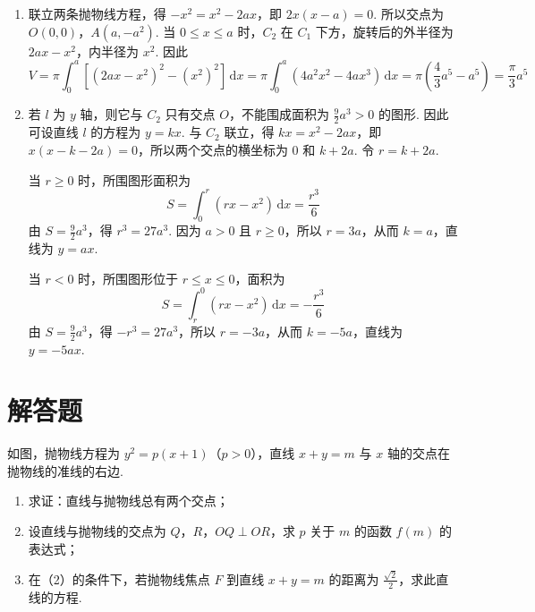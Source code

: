 \begin{solution}
\begin{enumerate}
\item 联立两条抛物线方程，得 \(-x^2=x^2-2ax\)，即 \(2x(x-a)=0\). 所以交点为 \(O(0,0)\)，\(A(a,-a^2)\). 当 \(0\leqslant x\leqslant a\) 时，\(C_2\) 在 \(C_1\) 下方，旋转后的外半径为 \(2ax-x^2\)，内半径为 \(x^2\). 因此
\[
V=\pi\int_0^a\left[(2ax-x^2)^2-(x^2)^2\right]\,\mathrm{d}x
=\pi\int_0^a(4a^2x^2-4ax^3)\,\mathrm{d}x
=\pi\left(\frac43a^5-a^5\right)=\frac\pi3a^5
\]
\item 若 \(l\) 为 \(y\) 轴，则它与 \(C_2\) 只有交点 \(O\)，不能围成面积为 \(\frac92a^3>0\) 的图形. 因此可设直线 \(l\) 的方程为 \(y=kx\). 与 \(C_2\) 联立，得 \(kx=x^2-2ax\)，即 \(x(x-k-2a)=0\)，所以两个交点的横坐标为 \(0\) 和 \(k+2a\). 令 \(r=k+2a\).

当 \(r\geqslant0\) 时，所围图形面积为
\[
S=\int_0^r\left(rx-x^2\right)\,\mathrm{d}x=\frac{r^3}{6}
\]
由 \(S=\frac92a^3\)，得 \(r^3=27a^3\). 因为 \(a>0\) 且 \(r\geqslant0\)，所以 \(r=3a\)，从而 \(k=a\)，直线为 \(y=ax\).

当 \(r<0\) 时，所围图形位于 \(r\leqslant x\leqslant0\)，面积为
\[
S=\int_r^0\left(rx-x^2\right)\,\mathrm{d}x=-\frac{r^3}{6}
\]
由 \(S=\frac92a^3\)，得 \(-r^3=27a^3\)，所以 \(r=-3a\)，从而 \(k=-5a\)，直线为 \(y=-5ax\).
\end{enumerate}
\end{solution}

\section{解答题}

\begin{problem}
如图，抛物线方程为 \(y^{2}=p(x+1)\)（\(p>0\)），直线 \(x+y=m\) 与 \(x\) 轴的交点在抛物线的准线的右边.

\begin{enumerate}
\item 求证：直线与抛物线总有两个交点；
\item 设直线与抛物线的交点为 \(Q\)，\(R\)，\(OQ \perp OR\)，求 \(p\) 关于 \(m\) 的函数 \(f(m)\) 的表达式；
\item 在（2）的条件下，若抛物线焦点 \(F\) 到直线 \(x + y = m\) 的距离为 \(\frac{\sqrt{2}}{2}\)，求此直线的方程.
\end{enumerate}

\end{problem}

